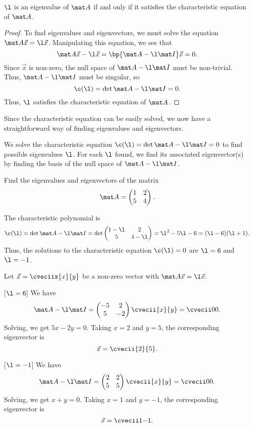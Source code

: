 \begin{proposition}
    $\l$ is an eigenvalue of $\mat A$ if and only if it satisfies the characteristic equation of $\mat A$.
\end{proposition}
\begin{proof}
    To find eigenvalues and eigenvectors, we must solve the equation $\mat A \vec x = \l \vec x$. Manipulating this equation, we see that \[\mat A \vec x - \l \vec x = \bp{\mat A - \l \mat I} \vec x = 0.\] Since $\vec x$ is non-zero, the null space of $\mat A - \l \mat I$ must be non-trivial. Thus, $\mat A - \l \mat I$ must be singular, so \[\c(\l) = \det{\mat A - \l \mat I} = 0.\] Thus, $\l$ satisfies the characteristic equation of $\mat A$.
\end{proof}

Since the characteristic equation can be easily solved, we now have a straightforward way of finding eigenvalues and eigenvectors.

\begin{recipe}
    We solve the characteristic equation $\c(\l) = \det{\mat A - \l \mat I} = 0$ to find possible eigenvalues $\l$. For each $\l$ found, we find its associated eigenvector(s) by finding the basis of the null space of $\mat A - \l \mat I$.
\end{recipe}

\begin{sample}
    Find the eigenvalues and eigenvectors of the matrix \[\mat A = \begin{pmatrix}1 & 2 \\ 5 & 4\end{pmatrix}.\]
\end{sample}
\begin{sample}
    The characteristic polynomial is \[\c(\l) = \det{\mat A - \l \mat I} = \det \begin{pmatrix}1 - \l & 2 \\ 5 & 4-\l\end{pmatrix} = \l^2 - 5\l -6 = (\l - 6)(\l + 1).\] Thus, the solutions to the characteristic equation $\c(\l) = 0$ are $\l = 6$ and $\l = -1$.

    Let $\vec x = \cveciix{x}{y}$ be a non-zero vector with $\mat A \vec x = \l \vec x.$

    [$\l = 6$] We have \[\mat A - \l \mat I = \begin{pmatrix}-5 & 2 \\ 5 & -2\end{pmatrix} \cvecii{x}{y} = \cvecii00.\] Solving, we get $5x - 2y = 0$. Taking $x = 2$ and $y = 5$, the corresponding eigenvector is \[\vec x = \cvecii{2}{5}.\]

    [$\l = -1$] We have \[\mat A- \l \mat I = \begin{pmatrix}2 & 2 \\ 5 & 5\end{pmatrix} \cvecii{x}{y} = \cvecii00.\] Solving, we get $x + y = 0$. Taking $x = 1$ and $y = -1$, the corresponding eigenvector is \[\vec x = \cvecii1{-1}.\]
\end{sample}

